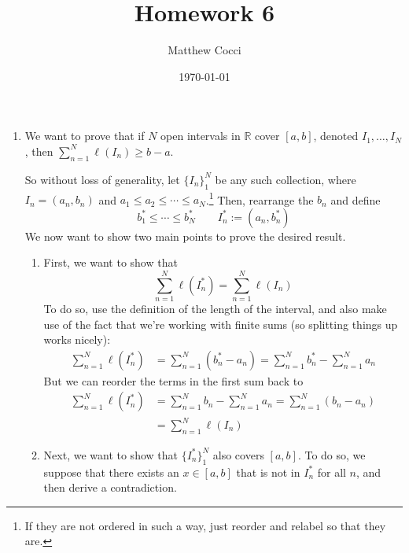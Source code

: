 \documentclass[12pt]{article}
\author{Matthew Cocci}
\title{\textbf{Homework 6}}
\date{\today}
\theoremstyle{plain}
\theoremstyle{definition}
\theoremstyle{remark}
\begin{document}
\maketitle 

\begin{enumerate} 

\item We want to prove that if $N$ open intervals in $\mathbb{R}$ cover $[a,b]$, denoted $I_1, \ldots,I_N$, then $\sum^N_{n=1} \ell(I_n)\geq b-a$.

So without loss of generality, let $\{I_n\}_1^N$ be any such collection, where $I_n=(a_n, b_n)$ and $a_1\leq a_2\leq\cdots\leq a_N$.\footnote{If they are not ordered in such a way, just reorder and relabel so that they are.} Then, rearrange the $b_n$ and define 
\[
    b_1^* \leq \cdots \leq b_N^* \qquad
    I_n^* := (a_n, b^*_n)
\]
We now want to show two main points to prove the desired result.
\begin{enumerate}

\item First, we want to show that
\begin{equation}
    \label{q1.eq}
    \sum^N_{n=1} \ell(I_n^*) = \sum^N_{n=1} \ell(I_n) 
\end{equation}
To do so, use the definition of the length of the interval, and also make use of the fact that we're working with finite sums (so splitting things up works nicely):
\begin{align*}
    \sum^N_{n=1} \ell(I_n^*) &= \sum^N_{n=1} (b_n^* - a_n )
    = \sum^N_{n=1} b_n^* -  \sum^N_{n=1}a_n 
\end{align*}
But we can reorder the terms in the first sum back to 
\begin{align*}
    \sum^N_{n=1} \ell(I_n^*) &= 
        \sum^N_{n=1} b_n -  \sum^N_{n=1}a_n 
    = \sum^N_{n=1} (b_n -  a_n) \\
    &= \sum^N_{n=1} \ell(I_n) 
\end{align*}

\item Next, we want to show that $\{I_n^*\}^N_1$ also covers $[a,b]$. To do so, we suppose that there exists an $x\in[a,b]$ that is not in $I^*_n$ for all $n$, and then derive a contradiction.
    

\end{enumerate}
\end{enumerate}
\end{document}

